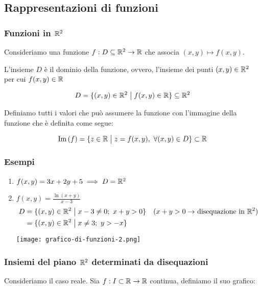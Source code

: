 \subsection{Rappresentazioni di funzioni}

\subsubsection{Funzioni in \texorpdfstring{\(\mathbb{R}^2\)}{R2}}

Consideriamo una funzione \(f: D \subseteq \mathbb{R}^2 \to \mathbb{R} \) che associa \((x,y) \mapsto f(x,y)\).

L'insieme \(D\) è il dominio della funzione, ovvero, l'insieme dei punti \((x,y) \in \mathbb{R}^2\) per cui \(f(x,y) \in \mathbb{R} \)

\[D = \{(x,y) \in \mathbb{R}^2 \;\big|\; f(x,y) \in \mathbb{R} \} \subseteq \mathbb{R}^2 \]

Definiamo tutti i valori che può assumere la funzione con l'immagine della funzione che è definita come segue:

\[\text{Im}\left(f\right) = \{z \in \mathbb{R} \;\big|\; z = f(x,y), ~\forall (x,y) \in D\} \subset \mathbb{R} \]

\subsubsection*{Esempi}

\begin{enumerate}
    \item \(f(x,y) = 3x + 2y + 5 \implies D=\mathbb{R}^2\)
    \item \(f(x,y) = \frac{\ln(x+y)}{x-3}\)
          \begin{align*}
              D & = \{(x,y) \in \mathbb{R}^2 \;\big|\; x-3 \ne 0;\ x+y > 0\} & \text{(\(x+y > 0 \to \) disequazione in \(\mathbb{R}^2\))} \\
                & = \{(x,y) \in \mathbb{R}^2 \;\big|\; x \ne 3;\ y > -x\}
          \end{align*}

          \texttt{[image: grafico-di-funzioni-2.png]}
\end{enumerate}

\filbreak{}
\subsubsection{Insiemi del piano \texorpdfstring{\(\mathbb{R}^2\)}{R2} determinati da disequazioni}

Consideriamo il caso reale. Sia \(f: I \subset \mathbb{R} \to \mathbb{R} \) continua, definiamo il suo grafico:

